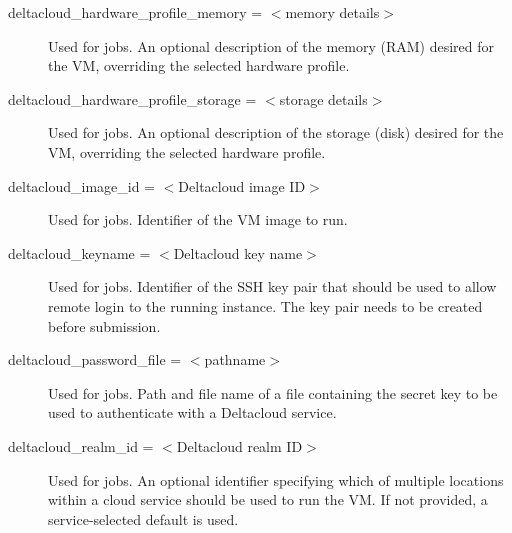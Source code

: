 \begin{description}

\label{condor-submit-deltacloud-hardware-profile-memory}
\item[deltacloud\_hardware\_profile\_memory = $<$memory details$>$]
Used for  jobs.
An optional description of the memory (RAM) desired for the VM, overriding
the selected hardware profile.


\label{condor-submit-deltacloud-hardware-profile-storage}
\item[deltacloud\_hardware\_profile\_storage = $<$storage details$>$]
Used for  jobs.
An optional description of the storage (disk) desired for the VM, overriding
the selected hardware profile.


\label{condor-submit-deltacloud-image-id}
\item[deltacloud\_image\_id = $<$Deltacloud image ID$>$]
Used for  jobs.
Identifier of the VM image to run.


\label{condor-submit-deltacloud-keyname}
\item[deltacloud\_keyname = $<$Deltacloud key name$>$]
Used for  jobs.
Identifier of the SSH key pair that should be used to allow remote login
to the running instance. The key pair needs to be created before
submission.


\label{condor-submit-deltacloud-password-file}
\item[deltacloud\_password\_file = $<$pathname$>$]
Used for  jobs.
Path and file name of a file containing the secret key to be used to
authenticate with a Deltacloud service.


\label{condor-submit-deltacloud-realm-id}
\item[deltacloud\_realm\_id = $<$Deltacloud realm ID$>$]
Used for  jobs.
An optional identifier specifying which of multiple locations within a
cloud service should be used to run the VM. If not provided, a
service-selected default is used.


\end{description}
